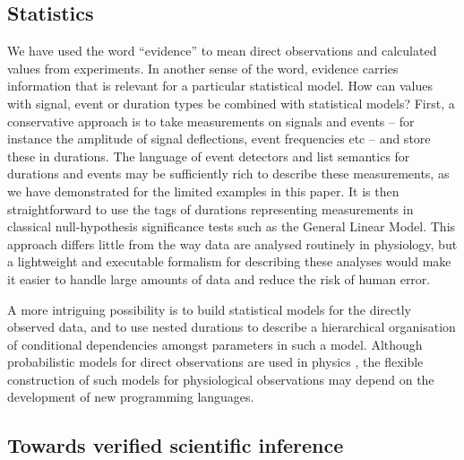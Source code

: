 \subsection*{Statistics}

We have used the word ``evidence'' to mean direct observations and
calculated values from experiments. In another sense of the word,
evidence carries information that is relevant for a particular
statistical model. How can values with signal, event or duration types
be combined with statistical models? First, a conservative approach is
to take measurements on signals and events -- for instance the
amplitude of signal deflections, event frequencies etc -- and store
these in durations. The language of event detectors and list semantics
for durations and events may be sufficiently rich to describe these
measurements, as we have demonstrated for the limited examples in this
paper. It is then straightforward to use the tags of durations
representing measurements in classical null-hypothesis significance
tests such as the General Linear Model. This approach differs little
from the way data are analysed routinely in physiology, but a
lightweight and executable formalism for describing these analyses
would make it easier to handle large amounts of data and reduce the
risk of human error.

A more intriguing possibility is to build statistical models for the
directly observed data, and to use nested durations to describe a
hierarchical organisation of conditional dependencies amongst
parameters in such a model. Although probabilistic models for direct
observations are used in physics \citep{Daniell1991}, the flexible
construction of such models for physiological observations may depend
on the development of new programming languages.

\subsection*{Towards verified scientific inference}

